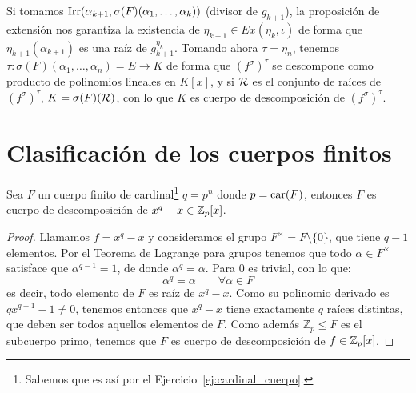 \begin{ejercicio}
\begin{figure}[H]
    \end{figure}
    Si tomamos $\operatorname{Irr}(\alpha_{k+1},\sigma(F)(\alpha_1, \ldots, \alpha_k))$ (divisor de $g_{k+1}$), la proposición de extensión nos garantiza la existencia de $\eta_{k+1}\in Ex(\eta_k,\iota)$ de forma que $\eta_{k+1}(\alpha_{k+1})$ es una raíz de $g_{k+1}^{\eta_k}$. Tomando ahora $\tau = \eta_{n}$, tenemos $\tau:\sigma(F)(\alpha_1, \ldots, \alpha_n) = E\to K$ de forma que ${(f^{\sigma})}^{\tau}$ se descompone como producto de polinomios lineales en $K[x]$, y si $\mathcal{R}$ es el conjunto de raíces de ${(f^{\sigma})}^{\tau}$, $K = \sigma(F)(\mathcal{R})$, con lo que $K$ es cuerpo de descomposición de ${(f^{\sigma})}^{\tau}$.
\end{ejercicio}

\section{Clasificación de los cuerpos finitos} 
\begin{prop}\label{prop:cuerpo_descomposicion}
    Sea $F$ un cuerpo finito de cardinal\footnote{Sabemos que es así por el Ejercicio~\ref{ej:cardinal_cuerpo}.} $q=p^n$  donde $p=\operatorname{car}(F)$, entonces $F$ es cuerpo de descomposición de $x^q-x\in \mathbb{Z}_p[x]$.
    \begin{proof}
        Llamamos $f=x^q-x$ y consideramos el grupo $F^{\times} = F\setminus\{0\}$, que tiene $q-1$ elementos. Por el Teorema de Lagrange para grupos tenemos que todo $\alpha\in F^{\times}$ satisface que $\alpha^{q-1}=1$, de donde $\alpha^q = \alpha$. Para $0$ es trivial, con lo que:
        \begin{equation*}
            \alpha^q = \alpha \qquad \forall \alpha\in F
        \end{equation*}
        es decir, todo elemento de $F$ es raíz de $x^q-x$. Como su polinomio derivado es $qx^{q-1}-1 \neq 0$, tenemos entonces que $x^q-x$ tiene exactamente $q$ raíces distintas, que deben ser todos aquellos elementos de $F$. Como además $\mathbb{Z}_p\leq F$ es el subcuerpo primo, tenemos que $F$ es cuerpo de descomposición de $f\in \mathbb{Z}_p[x]$.
    \end{proof}
\end{prop}

